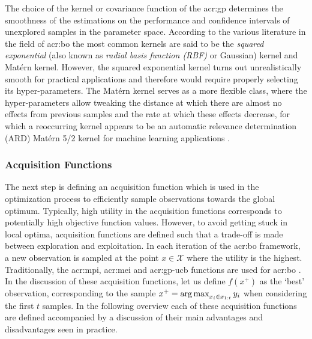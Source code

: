The choice of the kernel or covariance function of the \acrshort{acr:gp} determines the smoothness of the estimations on the performance and confidence intervals of unexplored samples in the parameter space.
According to the various literature in the field of \acrlong{acr:bo} the most common kernels are said to be the \textit{squared exponential} (also known as \textit{radial basis function (RBF)} or Gaussian) kernel and Mat\'ern kernel.
However, the squared exponential kernel turns out unrealistically smooth for practical applications \cite{snoek2012practical} and therefore would require properly selecting its hyper-parameters.
The Mat\'ern kernel serves as a more flexible class, where the hyper-parameters allow tweaking the distance at which there are almost no effects from previous samples and the rate at which these effects decrease, for which a reoccurring kernel appears to be an automatic relevance determination (ARD) Mat\'ern 5/2 kernel for machine learning applications \cite{snoek2012practical, kawaguchi2015bayesian}.




\subsubsection*{Acquisition Functions}
\label{sec:bayesian-optimization-acquisition}
The next step is defining an acquisition function which is used in the optimization process to efficiently sample observations towards the global optimum.
Typically, high utility in the acquisition functions corresponds to potentially high objective function values.
However, to avoid getting stuck in local optima, acquisition functions are defined such that a trade-off is made between exploration and exploitation.
In each iteration of the \acrshort{acr:bo} framework, a new observation is sampled at the point $x \in \mathcal{X}$ where the utility is the highest.
Traditionally, the \acrfull{acr:mpi}, \acrfull{acr:mei} and \acrfull{acr:gp-ucb} functions are used for \acrlong{acr:bo} \cite{shahriari2016taking}.
In the discussion of these acquisition functions, let us define $f(x^+)$ as the `best' observation, corresponding to the sample $x^+ = \operatorname*{arg\,max}_{x_i \in x_{1:t}} y_i$ when considering the first $t$ samples.
In the following overview each of these acquisition functions are defined accompanied by a discussion of their main advantages and disadvantages seen in practice.

